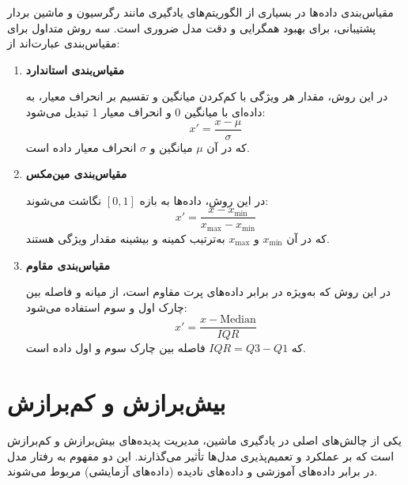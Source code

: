 مقیاس‌بندی داده‌ها در بسیاری از الگوریتم‌های یادگیری مانند رگرسیون و ماشین بردار پشتیبانی، برای بهبود همگرایی و دقت مدل ضروری است. سه روش متداول برای مقیاس‌بندی عبارت‌اند از:

\begin{enumerate}
	\item \textbf{مقیاس‌بندی استاندارد}

در این روش، مقدار هر ویژگی با کم‌کردن میانگین و تقسیم بر انحراف معیار، به داده‌ای با میانگین 0 و انحراف معیار 1 تبدیل می‌شود:
\[
x' = \frac{x - \mu}{\sigma}
\]
که در آن \(\mu\) میانگین و \(\sigma\) انحراف معیار داده است.

\item \textbf{مقیاس‌بندی مین‌مکس}

در این روش، داده‌ها به بازه \([0,1]\) نگاشت می‌شوند:
\[
x' = \frac{x - x_{\min}}{x_{\max} - x_{\min}}
\]
که در آن \(x_{\min}\) و \(x_{\max}\) به‌ترتیب کمینه و بیشینه مقدار ویژگی هستند.

\item \textbf{مقیاس‌بندی مقاوم}

در این روش که به‌ویژه در برابر داده‌های پرت مقاوم است، از میانه و فاصله بین چارک اول و سوم استفاده می‌شود:
\[
x' = \frac{x - \text{Median}}{IQR}
\]
که \(IQR = Q3 - Q1\) فاصله بین چارک سوم و اول داده است.

\end{enumerate}


\section{بیش‌برازش و کم‌برازش}

یکی از چالش‌های اصلی در یادگیری ماشین، مدیریت پدیده‌های بیش‌برازش و کم‌برازش است که بر عملکرد و تعمیم‌پذیری مدل‌ها تأثیر می‌گذارند. این دو مفهوم به رفتار مدل در برابر داده‌های آموزشی و داده‌های نادیده (داده‌های آزمایشی) مربوط می‌شوند.

